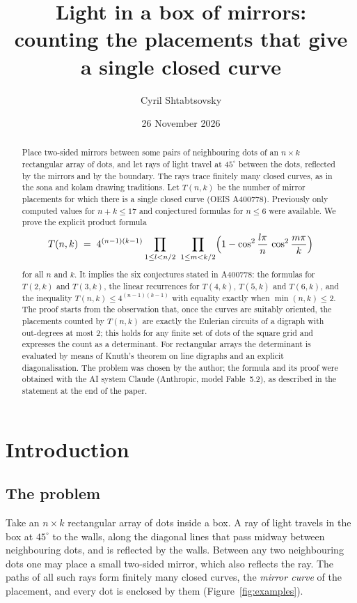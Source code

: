 \documentclass[11pt,a4paper]{amsart}
\title[Light in a box of mirrors]{Light in a box of mirrors:\\ counting the placements that give\\ a single closed curve}
\author[C. Shtabtsovsky]{Cyril Shtabtsovsky}
\date{26 November 2026}
\theoremstyle{remark}
\begin{document}
\begin{abstract}
Place two-sided mirrors between some pairs of neighbouring dots of an $n\times k$ rectangular array of dots, and
let rays of light travel at $45^\circ$ between the dots, reflected by the mirrors and by the boundary. The rays
trace finitely many closed curves, as in the sona and kolam drawing traditions. Let $T(n,k)$ be the number of
mirror placements for which there is a single closed curve (OEIS A400778). Previously only computed values for
$n+k\le 17$ and conjectured formulas for $n\le 6$ were available. We prove the explicit product formula
\[
T(n,k)\;=\;4^{(n-1)(k-1)}\prod_{1\le l<n/2}\ \prod_{1\le m<k/2}\Bigl(1-\cos^2\frac{l\pi}{n}\,\cos^2\frac{m\pi}{k}\Bigr)
\]
for all $n$ and $k$. It implies the six conjectures stated in A400778: the formulas for $T(2,k)$ and $T(3,k)$,
the linear recurrences for $T(4,k)$, $T(5,k)$ and $T(6,k)$, and the inequality $T(n,k)\le 4^{(n-1)(k-1)}$ with
equality exactly when $\min(n,k)\le 2$. The proof starts from the observation that, once the curves are suitably
oriented, the placements counted by $T(n,k)$ are exactly the Eulerian circuits of a digraph with out-degrees at
most $2$; this holds for any finite set of dots of the square grid and expresses the count as a determinant. For
rectangular arrays
the determinant is evaluated by means of Knuth's theorem on line digraphs and an explicit diagonalisation. The
problem was chosen by the author; the formula and its proof were obtained with the AI system Claude (Anthropic,
model Fable~5.2), as described in the statement at the end of the paper.
\end{abstract}

\maketitle

\section{Introduction}

\subsection{The problem}
Take an $n\times k$ rectangular array of dots inside a box. A ray of light travels in the box at $45^\circ$ to the
walls, along the diagonal lines that pass midway between neighbouring dots, and is reflected by the walls. Between
any two neighbouring dots one may place a small two-sided mirror, which also reflects the ray. The paths of all
such rays form finitely many closed curves, the \emph{mirror curve} of the placement, and every dot is enclosed by
them (Figure~\ref{fig:examples}).
\end{document}
